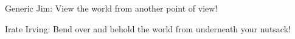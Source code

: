 \documentclass{article}
\begin{document}
Generic Jim: View the world from another point of view!

Irate Irving: Bend over and behold the world from underneath your
nutsack!
\end{document}
